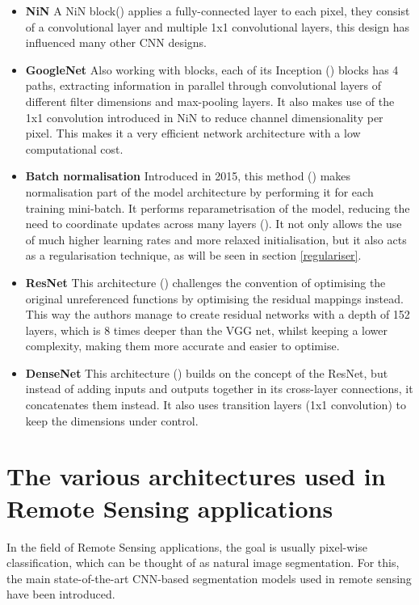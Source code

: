 \begin{itemize}

    \item \textbf{\gls{NiN}} A \gls{NiN} block(\cite{lin2014network}) applies a fully-connected layer to each pixel, they consist of a convolutional layer and multiple 1x1 convolutional layers, this design has influenced many other \gls{CNN} designs.
 
    \item \textbf{GoogleNet } Also working with blocks, each of its Inception (\cite{7298594}) blocks has 4 paths, extracting information in parallel through convolutional layers of different filter dimensions and max-pooling layers. It also makes use of the 1x1 convolution introduced in \gls{NiN} to reduce channel dimensionality per pixel. This makes it a very efficient network architecture with a low computational cost.
    
    \item \textbf{Batch normalisation} Introduced in 2015, this method (\cite{ioffe2015batch}) makes normalisation part of the model architecture by performing it for each training mini-batch. It performs reparametrisation of the model, reducing the need to coordinate updates across many layers (\cite{GoodBengCour16}). It not only allows the use of much higher learning rates and more relaxed initialisation, but it also acts as a regularisation technique, as will be seen in section \ref{regulariser}.
    
    \item \textbf{ResNet} This architecture (\cite{he2015deep}) challenges the convention of optimising the original unreferenced functions by optimising the residual mappings instead. This way the authors manage to create residual networks with a depth of 152 layers, which is $8$ times deeper than the VGG net, whilst keeping a lower complexity, making them more accurate and easier to optimise. 
    \item \textbf{DenseNet} This architecture (\cite{8099726}) builds on the concept of the ResNet, but instead of adding inputs and outputs together in its cross-layer connections, it concatenates them instead. It also uses transition layers (1x1 convolution) to keep the dimensions under control.

\end{itemize}

\section{The various architectures used in Remote Sensing applications} \label{seg_nets}
In the field of Remote Sensing applications, the goal is usually pixel-wise classification, which can be thought of as natural image segmentation. For this, the main state-of-the-art \gls{CNN}-based segmentation models used in remote sensing have been introduced.

